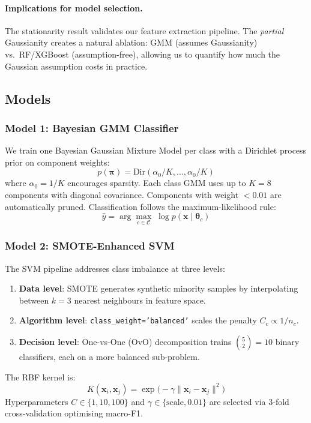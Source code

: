 \documentclass[11pt,a4paper]{article}
\begin{document}
\paragraph{Implications for model selection.}
The stationarity result validates our feature extraction pipeline. The
\textit{partial} Gaussianity creates a natural ablation: GMM (assumes
Gaussianity) vs.\ RF/XGBoost (assumption-free), allowing us to quantify
how much the Gaussian assumption costs in practice.

\subsection{Models}
\label{sec:models}

\subsubsection{Model 1: Bayesian GMM Classifier}

We train one Bayesian Gaussian Mixture Model per class with a Dirichlet
process prior on component weights:
\begin{equation}
  p(\boldsymbol{\pi}) = \text{Dir}(\alpha_0 / K, \dots, \alpha_0 / K)
\end{equation}
where $\alpha_0 = 1/K$ encourages sparsity. Each class GMM uses up to
$K = 8$ components with diagonal covariance. Components with weight
$< 0.01$ are automatically pruned. Classification follows the
maximum-likelihood rule:
\begin{equation}
  \hat{y} = \arg\max_{c \in \mathcal{C}} \;
             \log p(\mathbf{x} \mid \boldsymbol{\theta}_c)
  \label{eq:gmm_classify}
\end{equation}

\subsubsection{Model 2: SMOTE-Enhanced SVM}

The SVM pipeline addresses class imbalance at three levels:
\begin{enumerate}[nosep]
  \item \textbf{Data level}: SMOTE generates synthetic minority samples
        by interpolating between $k = 3$ nearest neighbours in feature space.
  \item \textbf{Algorithm level}: \texttt{class\_weight='balanced'}
        scales the penalty $C_c \propto 1 / n_c$.
  \item \textbf{Decision level}: One-vs-One (OvO) decomposition trains
        $\binom{5}{2} = 10$ binary classifiers, each on a more
        balanced sub-problem.
\end{enumerate}
The RBF kernel is:
\begin{equation}
  K(\mathbf{x}_i, \mathbf{x}_j) =
    \exp\!\bigl(-\gamma \|\mathbf{x}_i - \mathbf{x}_j\|^2\bigr)
\end{equation}
Hyperparameters $C \in \{1, 10, 100\}$ and
$\gamma \in \{\text{scale}, 0.01\}$ are selected via 3-fold
cross-validation optimising macro-F1.
\end{document}
